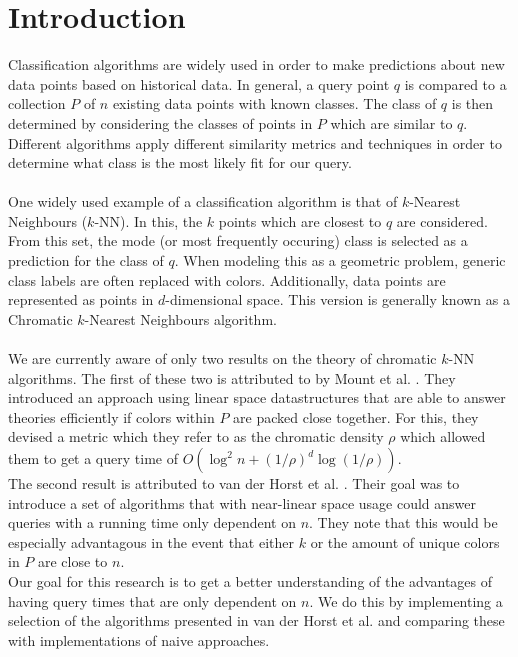 \documentclass{article}
\newcommand{\fb}[1]{{\color{blue}#1}}
\begin{document}
\section{Introduction}
\fb{
    Classification algorithms are widely used in order to make predictions about new data points based on historical data. In general, a query point $q$ is compared to a collection $P$ of $n$ existing data points with known classes. The class of $q$ is then determined by considering the classes of points in $P$ which are similar to $q$. Different algorithms apply different similarity metrics and techniques in order to determine what class is the most likely fit for our query. \\\\
    One widely used example of a classification algorithm is that of $k$-Nearest Neighbours ($k$-NN). In this, the $k$ points which are closest to $q$ are considered. From this set, the mode (or most frequently occuring) class is selected as a prediction for the class of $q$. When modeling this as a geometric problem, generic class labels are often replaced with colors. Additionally, data points are represented as points in $d$-dimensional space. This version is generally known as a Chromatic $k$-Nearest Neighbours algorithm. \\\\
    We are currently aware of only two results on the theory of chromatic $k$-NN algorithms. The first of these two is attributed to by Mount et al. \cite{MOUNT200097}. They introduced an approach using linear space datastructures that are able to answer theories efficiently if colors within $P$ are packed close together. For this, they devised a metric which they refer to as the chromatic density $\rho$ which allowed them to get a query time of $O(\log^2 n + (1/\rho)^d\log(1/\rho))$.\\
    The second result is attributed to van der Horst et al. \cite{vanderhorst_et_al:LIPIcs.ESA.2022.67}. Their goal was to introduce a set of algorithms that with near-linear space usage could answer queries with a running time only dependent on $n$. They note that this would be especially advantagous in the event that either $k$ or the amount of unique colors in $P$ are close to $n$. \\
    Our goal for this research is to get a better understanding of the advantages of having query times that are only dependent on $n$. We do this by implementing a selection of the algorithms presented in van der Horst et al. and comparing these with implementations of naive approaches. \\\\
}
\end{document}
